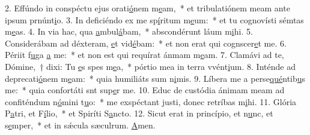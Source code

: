 2. Effúndo in conspéctu ejus orati\uline{ó}nem m\uline{e}am,~* et tribulatiónem meam ante ipsum prnúnt\uline{i}o.
3. In deficiéndo ex me sp\uline{í}ritum m\uline{e}um:~* et tu cognovísti sémtas m\uline{e}as.
4. In via hac, qua \uline{a}mbul\uline{á}bam,~* abscondérunt láum m\uline{i}hi.
5. Considerábam ad déxteram, \uline{e}t vid\uline{é}bam:~* et non erat qui cognscer\uline{e}t me.
6. Périit f\uline{u}ga \uline{a} me:~* et non est qui requírat ánmam m\uline{e}am.
7. Clamávi ad te, Dómine,~† dixi: Tu \uline{e}s spes m\uline{e}a,~* pórtio mea in terra vvént\uline{i}um.
8. Inténde ad deprecati\uline{ó}nem m\uline{e}am:~* quia humiliáts sum n\uline{i}mis.
9. Líbera me a perse\uline{qué}ntib\uline{u}s me:~* quia confortáti snt sup\uline{e}r me.
10. Educ de custódia ánimam meam ad confiténdum n\uline{ó}mini t\uline{u}o:~* me exspéctant justi, donec retríbas m\uline{i}hi.
11. Glória P\uline{a}tri, et F\uline{í}lio,~* et Spiríti S\uline{a}ncto.
12. Sicut erat in princípio, et n\uline{u}nc, et s\uline{e}mper,~* et in sǽcula sæculrum. \uline{A}men.

